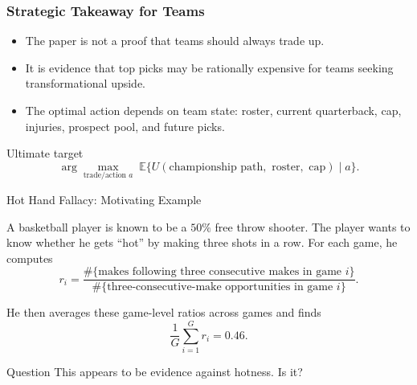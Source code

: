 \documentclass[aspectratio=169,professionalfonts]{beamer}
\newcommand{\E}{\mathbb{E}}
\begin{document}
\begin{frame}
\frametitle{Strategic Takeaway for Teams}
\begin{itemize}
  \item The paper is not a proof that teams should always trade up.
  \item It is evidence that top picks may be rationally expensive for teams seeking transformational upside.
  \item The optimal action depends on team state: roster, current quarterback, cap, injuries, prospect pool, and future picks.
\end{itemize}

\vspace{2mm}
\begin{block}{Ultimate target}
\[
  \arg\max_{\text{trade/action }a}\; \E\{U(\text{championship path},\text{ roster},\text{ cap})\mid a\}.
\]
\end{block}
\end{frame}








\begin{frame}{Hot Hand Fallacy: Motivating Example}
\large

A basketball player is known to be a  \(50\%\) free throw shooter.  The player wants to know whether he gets ``hot'' by making three shots in a row.  For each game, he computes
\[
r_i
=
\frac{\#\{\text{makes following three consecutive makes in game }i\}}
{\#\{\text{three-consecutive-make opportunities in game }i\}}.
\]

\medskip

He then averages these game-level ratios across games and finds
\[
\frac{1}{G}\sum_{i=1}^{G} r_i = 0.46.
\]

\medskip

\begin{block}{Question}
This appears to be evidence against hotness. Is it?
\end{block}

\end{frame}
\end{document}
